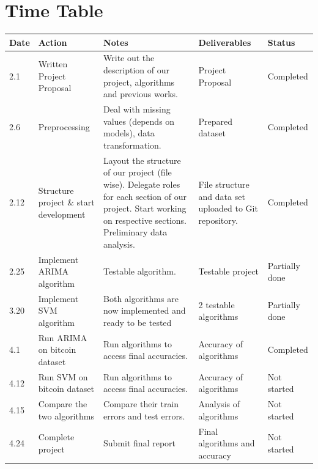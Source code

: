 \documentclass[11pt,a4paper]{article}
\begin{document}
\section{Time Table}
\begin{tabular}{ | p{1cm} | p{3cm} | p{4.5cm} | p{3cm} | p{2cm} | }
  \hline
  Date & Action & Notes & Deliverables & Status\\ \hline
  2.1 & Written Project Proposal & Write out the description of our project, algorithms and previous works. & Project Proposal & Completed\\ \hline
  2.6 & Preprocessing & Deal with missing values (depends on models), data transformation. & Prepared dataset & Completed\\ \hline
  2.12 & Structure project \& start development & Layout the structure of our project (file wise). Delegate roles for each section of our project. Start working on respective sections. Preliminary data analysis. & File structure and data set uploaded to Git repository.& Completed\\ \hline
  2.25 & Implement ARIMA algorithm & Testable algorithm. & Testable project& Partially done\\ \hline
  3.20 & Implement SVM algorithm & Both algorithms are now implemented and ready to be tested & 2 testable algorithms & Partially done\\ \hline
  4.1 & Run ARIMA on bitcoin dataset & Run algorithms to access final accuracies.  & Accuracy of algorithms   &  Completed \\ \hline
  4.12 & Run SVM on bitcoin dataset & Run algorithms to access final accuracies.  & Accuracy of algorithms &  Not started \\ \hline
  4.15 & Compare the two algorithms & Compare their train errors and test errors.  & Analysis of algorithms &  Not started \\ \hline
  4.24 & Complete project & Submit final report & Final algorithms and accuracy & Not started\\ \hline
\end{tabular}
\\


\end{document}
